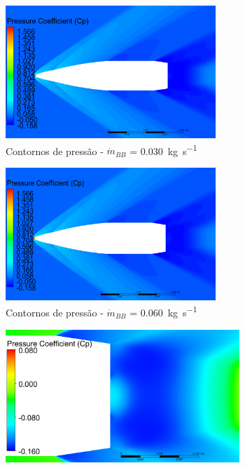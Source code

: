 
\begin{figure}[!htpb]
	\centering
	\begin{subfigure}[b]{0.47\textwidth} %
        \centering
        \includegraphics[height=5cm,width=\textwidth]{contorno-pressao-1500-vazao-0030-2pol.png}
        \caption{Contornos de pressão - \(\Dot{m}_{BB}\) = \qty{0,030}{\kilogram\per\second}}
        \label{fig:contorno-pressao-bb-1500K-vazao0030}
    \end{subfigure}
    \hfill
    \begin{subfigure}[b]{0.47\textwidth} %
        \centering
        \includegraphics[height=5cm,width=\textwidth]{contorno-pressao-1500-vazao-0060-2pol.png}
        \caption{Contornos de pressão - \(\Dot{m}_{BB}\) = \qty{0,060}{\kilogram\per\second}}
        \label{fig:contorno-pressao-bb-1500K-vazao0060}
    \end{subfigure}
    \hfill
    \begin{subfigure}[b]{0.47\textwidth} %
        \centering
        \includegraphics[height=5cm,width=\textwidth]{coeficientepressao-vazao0030-temp1500-diam2pol.png}

\end{subfigure}
\end{figure}
